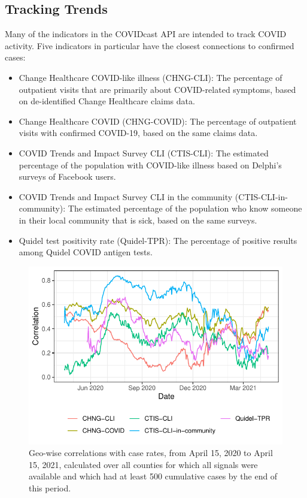 \documentclass[9pt,twocolumn,twoside,lineno]{pnas-new}
\begin{document}
\subsection{Tracking Trends}

Many of the indicators in the COVIDcast API are intended to track COVID
activity. Five indicators in particular have the closest connections to
confirmed cases:

\begin{itemize}
\item Change Healthcare COVID-like illness (CHNG-CLI): The percentage of
  outpatient visits that are primarily about COVID-related symptoms, based on
  de-identified Change Healthcare claims data.
\item Change Healthcare COVID (CHNG-COVID): The percentage of outpatient visits
  with confirmed COVID-19, based on the same claims data.
\item COVID Trends and Impact Survey CLI (CTIS-CLI): The estimated percentage
  of the population with COVID-like illness based on Delphi's surveys of
  Facebook users.
\item COVID Trends and Impact Survey CLI in the community
  (CTIS-CLI-in-community): The estimated percentage of the population who know 
  someone in their local community that is sick, based on the same surveys.
\item Quidel test positivity rate (Quidel-TPR): The percentage of positive
  results among Quidel COVID antigen tests.  
\end{itemize}

\begin{figure}[t]
  \includegraphics[width=\columnwidth]{fig/geo_wise_corr.pdf}
  \caption{Geo-wise correlations with case rates, from April 15, 2020 to April 
    15, 2021, calculated over all counties for which all signals were available
    and which had at least 500 cumulative cases by the end of this period.}
  \label{fig:geo_wise_correlation} 
\end{figure}
\end{document}
